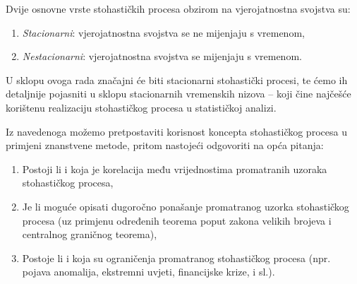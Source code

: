 \documentclass[a4paper,12pt,oneside]{memoir}
\begin{document}
            Dvije osnovne vrste stohastičkih procesa obzirom na vjerojatnostna svojstva su:

            \begin{enumerate}
                \item \textit{Stacionarni}: vjerojatnostna svojstva se ne mijenjaju s vremenom,
                \item \textit{Nestacionarni}: vjerojatnostna svojstva se mijenjaju s vremenom.
            \end{enumerate}

            U sklopu ovoga rada značajni će biti stacionarni stohastički procesi, te ćemo ih detaljnije pojasniti u sklopu stacionarnih vremenskih nizova -- koji čine najčešće korištenu realizaciju stohastičkog procesa u statističkoj analizi.

            Iz navedenoga možemo pretpostaviti korisnost koncepta stohastičkog procesa u primjeni znanstvene metode, pritom nastojeći odgovoriti na opća pitanja:

            \begin{enumerate}
                \item Postoji li i koja je korelacija među vrijednostima promatranih uzoraka stohastičkog procesa,
                \item Je li moguće opisati dugoročno ponašanje promatranog uzorka stohastičkog procesa (uz primjenu određenih teorema poput zakona velikih brojeva i centralnog graničnog teorema),
                \item Postoje li i koja su ograničenja promatranog stohastičkog procesa (npr. pojava anomalija, ekstremni uvjeti, financijske krize, i sl.).
            \end{enumerate}      



\end{document}
